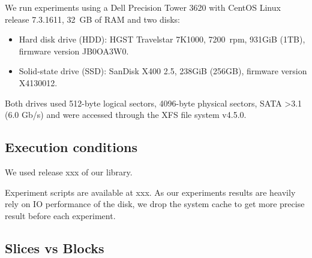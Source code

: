 \documentclass[10pt, conference, compsocconf]{IEEEtran}
\begin{document}
We run experiments using a Dell Precision Tower 3620 with CentOS Linux release
7.3.1611, 32~GB of RAM and two disks:
\begin{itemize}
  \item Hard disk drive (HDD): HGST Travelstar 7K1000, 7200~rpm, 931GiB (1TB), firmware version JB0OA3W0.
    \item Solid-state drive (SSD): SanDisk X400 2.5, 238GiB (256GB),
      firmware version X4130012.
\end{itemize}
Both drives used 512-byte logical sectors, 4096-byte physical sectors,
SATA >3.1 (6.0 Gb/s) and were accessed through the XFS file system
v4.5.0.

\subsection{Execution conditions}

We used release xxx of our library. 

Experiment scripts are available at xxx.
As our experiments results are heavily rely on IO performance of the disk,
we drop the system cache to get more precise result before each experiment.

\subsection{Slices vs Blocks}
\end{document}
